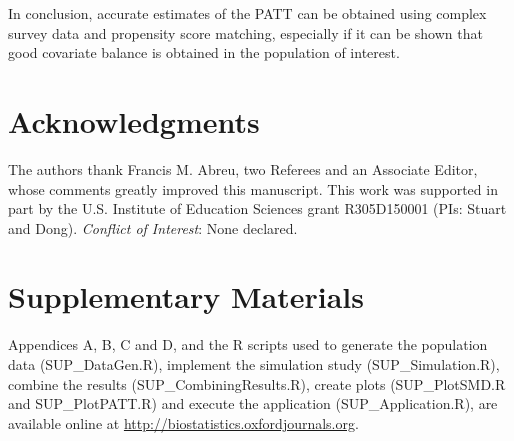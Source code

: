 \documentclass[oupdraft]{bio}
\begin{document}
In conclusion, accurate estimates of the PATT can be obtained using complex survey data and propensity score matching, especially if it can be shown that good covariate balance is obtained in the population of interest.


\section*{Acknowledgments}
The authors thank Francis M. Abreu, two Referees and an Associate Editor, whose comments greatly improved this manuscript.  
This work was supported in part by the U.S. Institute of Education Sciences grant R305D150001 (PIs: Stuart and Dong).
{\it Conflict of Interest}: None declared.


\section*{Supplementary Materials}
\label{sec8}
Appendices A, B, C and D, and the R scripts used to generate the population data (SUP\_DataGen.R), implement the simulation study (SUP\_Simulation.R), combine the results (SUP\_CombiningResults.R), create plots (SUP\_PlotSMD.R and SUP\_PlotPATT.R) and execute the application (SUP\_Application.R), are available online at
\url{http://biostatistics.oxfordjournals.org}.




\clearpage
\end{document}
